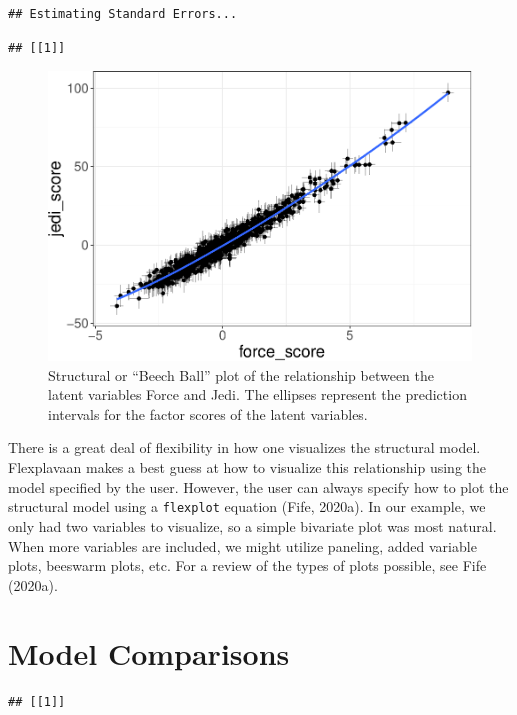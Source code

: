 \documentclass[
  english,
  doc]{apa6}
\begin{document}
\begin{verbatim}
## Estimating Standard Errors...
\end{verbatim}

\begin{verbatim}
## [[1]]
\end{verbatim}

\begin{figure}
\centering
\includegraphics{flexplavaan_draft_files/figure-latex/beech-1.pdf}
\caption{\label{fig:beech}Structural or ``Beech Ball'' plot of the relationship between the latent variables Force and Jedi. The ellipses represent the prediction intervals for the factor scores of the latent variables.}
\end{figure}

There is a great deal of flexibility in how one visualizes the structural model. Flexplavaan makes a best guess at how to visualize this relationship using the model specified by the user. However, the user can always specify how to plot the structural model using a \texttt{flexplot} equation (Fife, 2020a). In our example, we only had two variables to visualize, so a simple bivariate plot was most natural. When more variables are included, we might utilize paneling, added variable plots, beeswarm plots, etc. For a review of the types of plots possible, see Fife (2020a).

\hypertarget{model-comparisons}{%
\section{Model Comparisons}\label{model-comparisons}}

\begin{verbatim}
## [[1]]
\end{verbatim}
\end{document}
